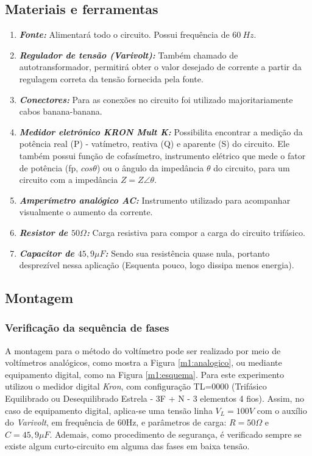 \documentclass[a4paper,12pt,oneside,openany,table,xcdraw]{article}
\begin{document}
\subsection{Materiais e ferramentas} %
\begin{enumerate}[1 -]
\item \emph{\textbf{Fonte:}}
Alimentará todo o circuito. Possui frequência de $60\ Hz$.

\item \emph{\textbf{Regulador de tensão (Varivolt):}}
Também chamado de autotransformador, permitirá obter o valor desejado de corrente a partir da regulagem correta da tensão fornecida pela fonte.

\item \emph{\textbf{Conectores:}}
Para as conexões no circuito foi utilizado majoritariamente cabos banana-banana.

\item \emph{\textbf{Medidor eletrônico KRON Mult K:}}
Possibilita encontrar a medição da potência real (P) - vatímetro, reativa (Q) e aparente (S) do circuito. Ele também possui função de cofasímetro, instrumento elétrico que mede o fator de potência (fp, $cos\theta$) ou o ângulo da impedância $\theta$ do circuito, para um circuito com a impedância $Z = Z\angle \theta$.

\item \emph{\textbf{Amperímetro analógico AC:}}
Instrumento utilizado para acompanhar visualmente o aumento da corrente.

\item \emph{\textbf{Resistor de $50\Omega$:}}
Carga resistiva para compor a carga do circuito trifásico.

\item \emph{\textbf{Capacitor de $45,9\mu F$:}}
Sendo sua resistência quase nula, portanto desprezível nessa aplicação (Esquenta pouco, logo dissipa menos energia).
\end{enumerate}

\vspace{0.2cm}
\subsection{Montagem} %

\subsubsection{Verificação da sequência de fases}
A montagem para o método do voltímetro pode ser realizado por meio de voltímetros analógicos, como mostra a Figura \ref{m1:analogico}, ou mediante equipamento digital, como na Figura \ref{m1:esquema}. Para este experimento utilizou o medidor digital \emph{Kron}, com configuração TL=0000 (Trifásico Equilibrado ou Desequilibrado Estrela - 3F + N - 3 elementos 4 fios). 
Assim, no caso de equipamento digital, aplica-se uma tensão linha $V_L=100V$ com o auxílio do \emph{Varivolt}, em frequência de 60Hz, e parâmetros de carga: $R=50\Omega$ e $C=45,9 \mu F$. Ademais, como procedimento de segurança, é verificado sempre se existe algum curto-circuito em alguma das fases em baixa tensão.
\end{document}
